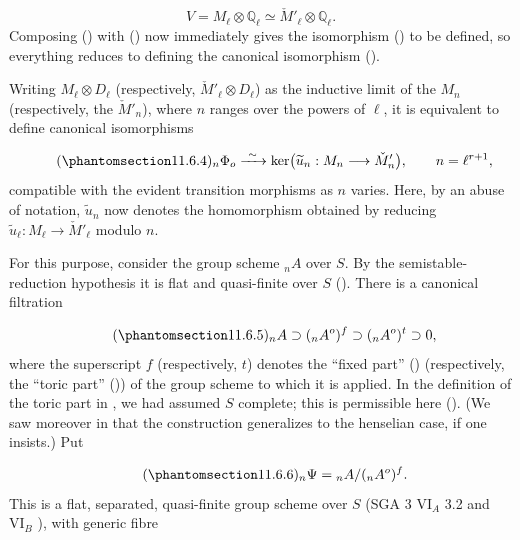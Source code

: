 \begin{equation*}
V=M_\ell\otimes\mathbb Q_\ell
 \simeq\check M'_\ell\otimes\mathbb Q_\ell.
\end{equation*}
Composing () with () now immediately gives the isomorphism
() to be defined, so everything reduces to defining the canonical
isomorphism ().

Writing $M_\ell\otimes D_\ell$ (respectively,
$\check M'_\ell\otimes D_\ell$) as the inductive limit of the $M_n$
(respectively, the $\check M'_n$), where $n$ ranges over the powers of
$\ell$, it is equivalent to define canonical isomorphisms

\begin{equation}\tag{\SGARefTarget{sga7.sga7i.eix.n11-6-4}{11.6.4}}
{}_n\Phi_o\xrightarrow{\ \sim\ }
 \ker\bigl(\widetilde u_n:M_n\longrightarrow\check M'_n\bigr),
 \qquad n=\ell^{r+1},
\end{equation}
compatible with the evident transition morphisms as $n$ varies. Here,
by an abuse of notation, $\widetilde u_n$ now denotes the homomorphism
obtained by reducing
$\widetilde u_\ell:M_\ell\to\check M'_\ell$ modulo $n$.

For this purpose, consider the group scheme ${}_nA$ over $S$. By the
semistable-reduction hypothesis it is flat and quasi-finite over $S$
(). There is a canonical filtration

\begin{equation}\tag{\SGARefTarget{sga7.sga7i.eix.n11-6-5}{11.6.5}}
{}_nA\supset({}_nA^o)^f\supset({}_nA^o)^t\supset0,
\end{equation}
where the superscript $f$ (respectively, $t$) denotes the ``fixed part''
() (respectively, the ``toric part'' ()) of the group scheme to
which it is applied. In the definition of the toric part in , we had
assumed $S$ complete; this is permissible here (). (We saw moreover
in  that the construction generalizes to the henselian case, if one
insists.) Put

\begin{equation}\tag{\SGARefTarget{sga7.sga7i.eix.n11-6-6}{11.6.6}}
{}_n\Psi={}_nA/({}_nA^o)^f.
\end{equation}
This is a flat, separated, quasi-finite group scheme over $S$
(SGA 3 $\mathrm{VI}_A$ 3.2 and $\mathrm{VI}_B$ ), with generic fibre

